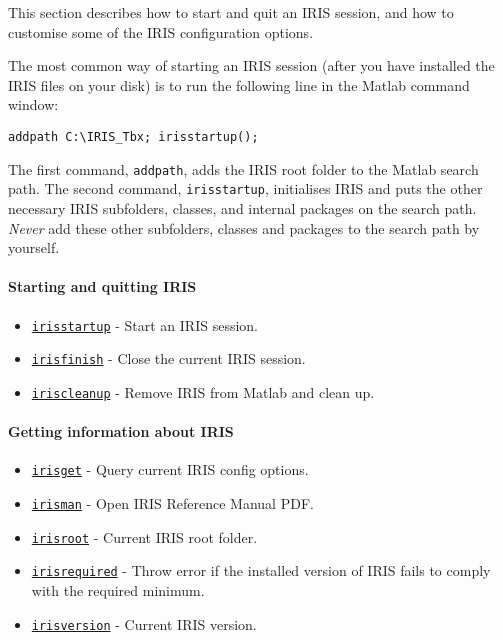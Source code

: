

	This section describes how to start and quit an IRIS session, and how to
customise some of the IRIS configuration options.

The most common way of starting an IRIS session (after you have
installed the IRIS files on your disk) is to run the following line in
the Matlab command window:

\begin{verbatim}
addpath C:\IRIS_Tbx; irisstartup();
\end{verbatim}

The first command, \texttt{addpath}, adds the IRIS root folder to the
Matlab search path. The second command, \texttt{irisstartup},
initialises IRIS and puts the other necessary IRIS subfolders, classes,
and internal packages on the search path. \emph{Never} add these other
subfolders, classes and packages to the search path by yourself.

\paragraph{Starting and quitting IRIS}

\begin{itemize}
\itemsep1pt\parskip0pt
\item
  \href{config/irisstartup}{\texttt{irisstartup}} - Start an IRIS
  session.
\item
  \href{config/irisfinish}{\texttt{irisfinish}} - Close the current IRIS
  session.
\item
  \href{config/iriscleanup}{\texttt{iriscleanup}} - Remove IRIS from
  Matlab and clean up.
\end{itemize}

\paragraph{Getting information about
IRIS}

\begin{itemize}
\itemsep1pt\parskip0pt
\item
  \href{config/irisget}{\texttt{irisget}} - Query current IRIS config
  options.
\item
  \href{config/irisman}{\texttt{irisman}} - Open IRIS Reference Manual
  PDF.
\item
  \href{config/irisroot}{\texttt{irisroot}} - Current IRIS root folder.
\item
  \href{config/irisrequired}{\texttt{irisrequired}} - Throw error if the
  installed version of IRIS fails to comply with the required minimum.
\item
  \href{config/irisversion}{\texttt{irisversion}} - Current IRIS
  version.
\end{itemize}

